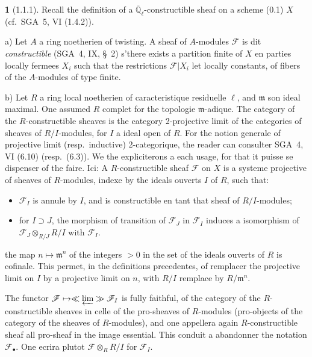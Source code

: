 \documentclass[12pt,a4paper]{article}
\theoremstyle{plain}
\theoremstyle{definition}
\theoremstyle{definition}
\newtheorem{para}{}[section]
\theoremstyle{remark}
\newcommand{\limproj}{\varprojlim}
\begin{document}
\begin{para}[1.1.1]
Recall the definition of a $\overline{\mathbb{Q}}_\ell$-constructible sheaf on a scheme (0.1) $X$ (cf.~SGA~5, VI (1.4.2)).

a) Let $A$ a ring noetherien of twisting. A sheaf of $A$-modules $\mathscr{F}$ is dit \emph{constructible} (SGA~4, IX, \S~2) s'there exists a partition finite of $X$ en parties locally fermees $X_i$ such that the restrictions $\mathscr{F}|X_i$ let locally constants, of fibers of the $A$-modules of type finite.

b) Let $R$ a ring local noetherien of caracteristique residuelle $\ell$, and $\mathfrak{m}$ son ideal maximal. One assumed $R$ complet for the topologie $\mathfrak{m}$-adique. The category of the $R$-constructible sheaves is the category 2-projective limit of the categories of sheaves of $R/I$-modules, for $I$ a ideal open of $R$. For the notion generale of projective limit (resp.~inductive) 2-categorique, the reader can consulter SGA~4, VI (6.10) (resp.~(6.3)). We the expliciterons a each usage, for that it puisse se dispenser of the faire. Ici: A $R$-constructible sheaf $\mathscr{F}$ on $X$ is a systeme projective of sheaves of $R$-modules, indexe by the ideals ouverts $I$ of $R$, such that:
\begin{itemize}[nosep]
\item[$\alpha$)] $\mathscr{F}_I$ is annule by $I$, and is constructible en tant that sheaf of $R/I$-modules;
\item[$\beta$)] for $I \supset J$, the morphism of transition of $\mathscr{F}_J$ in $\mathscr{F}_I$ induces a isomorphism of $\mathscr{F}_J \otimes_{R/J} R/I$ with $\mathscr{F}_I$.
\end{itemize}

the map $n \mapsto \mathfrak{m}^n$ of the integers $> 0$ in the set of the ideals ouverts of $R$ is cofinale. This permet, in the definitions precedentes, of remplacer the projective limit on $I$ by a projective limit on $n$, with $R/I$ remplace by $R/\mathfrak{m}^n$.

The functor $\mathscr{F} \mapsto \ll \limproj \gg \mathscr{F}_I$ is fully faithful, of the category of the $R$-constructible sheaves in celle of the pro-sheaves of $R$-modules (pro-objects of the category of the sheaves of $R$-modules), and one appellera again $R$-constructible sheaf all pro-sheaf in the image essential. This conduit a abandonner the notation $\mathscr{F}_\bullet$. One ecrira plutot $\mathscr{F} \otimes_R R/I$ for $\mathscr{F}_I$.


\end{para}
\end{document}
